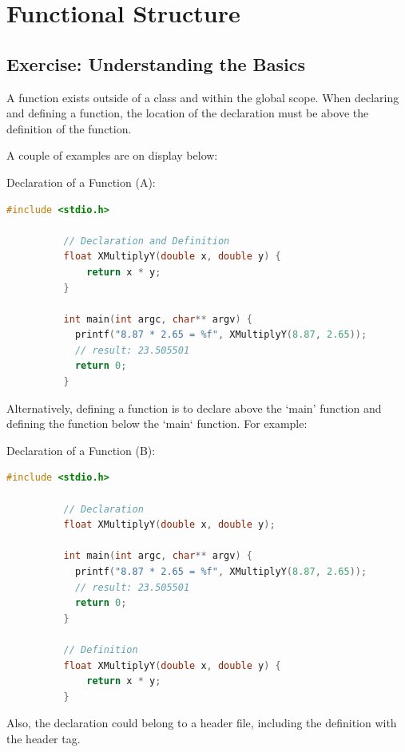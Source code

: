 \documentclass[10pt]{article}
\begin{document}
\newpage
\section{Functional Structure}
\label{sec:functional-structure}
    \subsection{Exercise: Understanding the Basics}
      A function exists outside of a class and within the global scope. When declaring and defining a function, the location of the declaration must be above the definition of the function.
      
      A couple of examples are on display below:

      \begin{example}{Declaration of a Function (A):}
        \begin{lstlisting}[language=c]
          #include <stdio.h>

          // Declaration and Definition
          float XMultiplyY(double x, double y) {
              return x * y;
          }

          int main(int argc, char** argv) {
            printf("8.87 * 2.65 = %f", XMultiplyY(8.87, 2.65)); 
            // result: 23.505501
            return 0;
          }
        \end{lstlisting}
      \end{example}

      Alternatively, defining a function is to declare above the `main' function and defining the function below the `main` function. For example:

      \begin{example}{Declaration of a Function (B):}
        \begin{lstlisting}[language=c]
          #include <stdio.h>

          // Declaration
          float XMultiplyY(double x, double y);

          int main(int argc, char** argv) {
            printf("8.87 * 2.65 = %f", XMultiplyY(8.87, 2.65)); 
            // result: 23.505501
            return 0;
          }

          // Definition
          float XMultiplyY(double x, double y) {
              return x * y;
          }
        \end{lstlisting}

        Also, the declaration could belong to a header file, including the definition with the header tag.
      \end{example}
\end{document}
